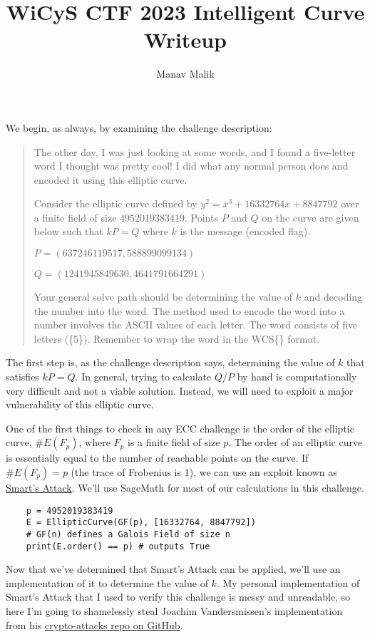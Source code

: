 \documentclass{article}
\title{WiCyS CTF 2023 Intelligent Curve Writeup}
\author{Manav Malik}
\date{}
\begin{document}
\maketitle

We begin, as always, by examining the challenge description:

\begin{quote}
    The other day, I was just looking at some words, and I found a five-letter word I thought was pretty cool! I did what any normal person does and encoded it using this elliptic curve.
    
    Consider the elliptic curve defined by $y^2 = x^3 + 16332764x + 8847792$ over a finite field of size $4952019383419$. Points $P$ and $Q$ on the curve are given below such that $kP = Q$ where $k$ is the message (encoded flag).
    
    $P = (637246119517, 588899099134)$
    
    $Q = (1241945849630, 4641791664291)$
    
    Your general solve path should be determining the value of $k$ and decoding the number into the word. The method used to encode the word into a number involves the ASCII values of each letter. The word consists of five letters ({\sf [a-zA-Z]\{5\}}). Remember to wrap the word in the {\sf WCS\{\}} format.
\end{quote}
The first step is, as the challenge description says, determining the value of $k$ that satisfies $kP=Q$. In general, trying to calculate $Q/P$ by hand is computationally very difficult and not a viable solution. Instead, we will need to exploit a major vulnerability of this elliptic curve.

One of the first things to check in any ECC challenge is the order of the elliptic curve, $\#E(F_p)$, where $F_p$ is a finite field of size $p$. The order of an elliptic curve is essentially equal to the number of reachable points on the curve. If $\#E(F_p)=p$ (the trace of Frobenius is 1), we can use an exploit known as \href{https://www.hpl.hp.com/techreports/97/HPL-97-128.pdf}{Smart's Attack}. We'll use SageMath for most of our calculations in this challenge. 

\begin{verbatim}
    p = 4952019383419
    E = EllipticCurve(GF(p), [16332764, 8847792])
    # GF(n) defines a Galois Field of size n
    print(E.order() == p) # outputs True
\end{verbatim}
Now that we've determined that Smart's Attack can be applied, we'll use an implementation of it to determine the value of $k$.
\newpage
My personal implementation of Smart's Attack that I used to verify this challenge is messy and unreadable, so here I'm going to shamelessly steal Joachim Vandersmissen's implementation from his \href{https://github.com/jvdsn/crypto-attacks}{crypto-attacks repo on GitHub}.
\end{document}
